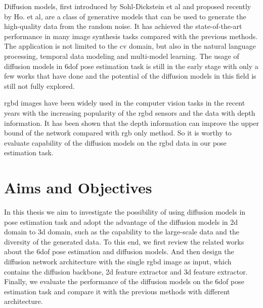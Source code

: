 \documentclass[12pt,DIV14,BCOR12mm,a4paper,footinclude=false,headinclude,parskip=half-,twoside,openright,cleardoublepage=empty,toc=index,bibliography=totoc,listof=totoc]{scrreprt}
\numberwithin{equation}{chapter}
\begin{document}
Diffusion models, first introduced by Sohl-Dickstein et al\cite{sohldickstein2015deep} and proposed recently by Ho. et al\cite{ho2020denoising}, are a class of generative models that can be used to generate the high-quality data from the random noise. It has achieved the state-of-the-art performance in many image synthesis tasks compared with the previous methods. The application is not limited to the \gls{cv} domain, but also in the natural language processing, temporal data modeling and multi-model learning. The usage of diffusion models in \gls{6dof} pose estimation task is still in the early stage with only a few works that have done and the potential of the diffusion models in this field is still not fully explored.

\gls{rgbd} images have been widely used in the computer vision tasks in the recent years with the increasing popularity of the \gls{rgbd} sensors and the data with depth information. It has been shown that the depth information can improve the upper bound of the network compared with \gls{rgb} only method. So it is worthy to evaluate capability of the diffusion models on the \gls{rgbd} data in our pose estimation task.
\section{Aims and Objectives}
In this thesis we aim to investigate the possibility of using diffusion models in pose estimation task and adopt the advantage of the diffusion models in \gls{2d} domain to \gls{3d} domain, such as the capability to the large-scale data and the diversity of the generated data. To this end, we first review the related works about the \gls{6dof} pose estimation and diffusion models. And then design the diffusion network architecture with the single \gls{rgbd} image as input, which contains the diffusion backbone, \gls{2d} feature extractor and \gls{3d} feature extractor. Finally, we evaluate the performance of the diffusion models on the \gls{6dof} pose estimation task and compare it with the previous methods with different architecture.
\end{document}
